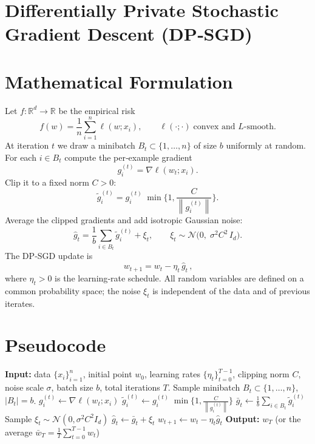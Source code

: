 \documentclass{article}
\newcommand{\R}{\mathbb{R}}
\newcommand{\norm}[1]{\left\lVert #1\right\rVert}
\begin{document}
\section*{Differentially Private Stochastic Gradient Descent (DP‑SGD)}

\section*{Mathematical Formulation}
Let $f:\R^{d}\to\R$ be the empirical risk
\[
f(w)=\frac{1}{n}\sum_{i=1}^{n}\ell(w;x_i),\qquad 
\ell(\cdot;\cdot)\;\text{convex and $L$‑smooth}.
\]
At iteration $t$ we draw a minibatch $B_t\subset\{1,\dots,n\}$ of size $b$ uniformly at random.
For each $i\in B_t$ compute the per‑example gradient
\[
g_i^{(t)}=\nabla \ell(w_t;x_i).
\]
Clip it to a fixed norm $C>0$:
\[
\tilde g_i^{(t)}=g_i^{(t)}\;\min\!\Big\{1,\frac{C}{\norm{g_i^{(t)}}}\Big\}.
\]
Average the clipped gradients and add isotropic Gaussian noise:
\[
\hat g_t=\frac{1}{b}\sum_{i\in B_t}\tilde g_i^{(t)}+ \xi_t,\qquad 
\xi_t\sim\mathcal N\!\big(0,\;\sigma^{2}C^{2}\,I_d\big).
\]
The DP‑SGD update is
\[
\boxed{\,w_{t+1}=w_t-\eta_t\,\hat g_t\,},
\]
where $\eta_t>0$ is the learning‑rate schedule.  
All random variables are defined on a common probability space; the noise $\xi_t$ is independent of the data and of previous iterates.

\section*{Pseudocode}
\begin{algorithm}[H]
\caption{DP‑SGD}
\begin{algorithmic}[1]
\STATE \textbf{Input:} data $\{x_i\}_{i=1}^n$, initial point $w_0$, learning rates $\{\eta_t\}_{t=0}^{T-1}$,
clipping norm $C$, noise scale $\sigma$, batch size $b$, total iterations $T$.
    \STATE Sample minibatch $B_t\subset\{1,\dots,n\}$, $|B_t|=b$.
        \STATE $g_i^{(t)}\gets \nabla\ell(w_t;x_i)$
        \STATE $\tilde g_i^{(t)}\gets g_i^{(t)}\;\min\!\Big\{1,\frac{C}{\norm{g_i^{(t)}}}\Big\}$ 
    \ENDFOR
    \STATE $\bar g_t\gets \frac{1}{b}\sum_{i\in B_t}\tilde g_i^{(t)}$
    \STATE Sample $\xi_t\sim\mathcal N(0,\sigma^{2}C^{2}I_d)$
    \STATE $\hat g_t\gets \bar g_t+\xi_t$
    \STATE $w_{t+1}\gets w_t-\eta_t\hat g_t$
\ENDFOR
\STATE \textbf{Output:} $w_T$ (or the average $\bar w_T=\frac1T\sum_{t=0}^{T-1}w_t$)
\end{algorithmic}
\end{algorithm}
\end{document}
